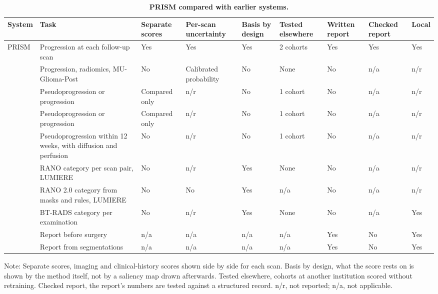 \documentclass[largeformat]{interact} %
\begin{document}
\begin{table}[!htbp]
\centering
\caption[PRISM compared with earlier systems]{\textbf{PRISM compared with earlier systems.}}
\label{tab:systems}
\scriptsize
\zebrarows
\begin{tabularx}{\linewidth}{@{}R{2.2cm}LR{1.1cm}R{1.2cm}R{1.2cm}R{1.2cm}R{0.9cm}R{1.0cm}R{0.8cm}@{}}
\toprule
System & Task & Separate scores & Per-scan uncertainty & Basis by design & Tested elsewhere & Written report & Checked report & Local \\
\midrule
PRISM & Progression at each follow-up scan & Yes & Yes & Yes & 2 cohorts & Yes & Yes & Yes \\
\citet{christodoulou2026} & Progression, radiomics, MU-Glioma-Post & No & Calibrated probability & No & None & No & n/a & n/r \\
\citet{gomaa2025} & Pseudoprogression or progression & Compared only & n/r & No & 1 cohort & No & n/a & n/r \\
\citet{jang2018} & Pseudoprogression or progression & Compared only & n/r & No & 1 cohort & No & n/a & n/r \\
\citet{kim2019} & Pseudoprogression within 12 weeks, with diffusion and perfusion & No & n/r & No & 1 cohort & No & n/a & n/r \\
\citet{tarek2026} & RANO category per scan pair, LUMIERE & No & n/r & Yes & None & No & n/a & n/r \\
\citet{siakallis2026} & RANO 2.0 category from masks and rules, LUMIERE & No & No & Yes & n/a & No & n/a & n/r \\
\citet{jabal2026} & BT-RADS category per examination & No & n/r & Yes & None & No & n/a & Yes \\
\citet{herasrivera2026} & Report before surgery & n/a & n/a & n/a & n/a & Yes & No & Yes \\
\citet{valerio2025} & Report from segmentations & n/a & n/a & n/a & n/a & Yes & No & Yes \\
\bottomrule
\end{tabularx}
\par\smallskip
{\raggedright\footnotesize Note: Separate scores, imaging and clinical-history scores shown side by side for each scan. Basis by
design, what the score rests on is shown by the method itself, not by a saliency map drawn afterwards. Tested elsewhere,
cohorts at another institution scored without retraining. Checked report, the report's numbers are tested against a
structured record. n/r, not reported; n/a, not applicable.\par}
\end{table}
\end{document}
